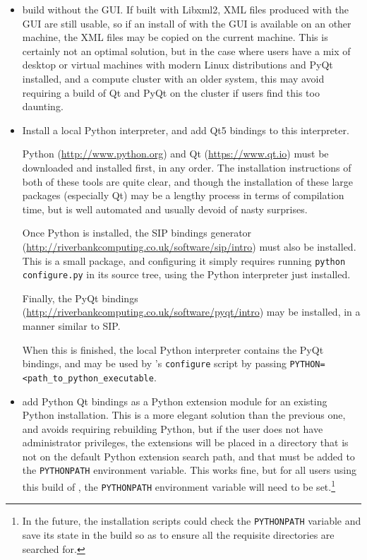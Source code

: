 \documentclass[a4paper,10pt,twoside]{csshortdoc}
\begin{document}
\begin{itemize}

\item build \CS without the GUI. If built with Libxml2, XML files
      produced with the GUI are still usable, so if an install of \CS
      with the GUI is available on an other machine, the XML files
      may be copied on the current machine. This is certainly not an optimal
      solution, but in the case where users have a mix of desktop or virtual
      machines with modern Linux distributions and PyQt installed, and
      a compute cluster with an older system, this may avoid requiring
      a build of Qt and PyQt on the cluster if users find this too daunting.

\item Install a local Python interpreter, and add Qt5 bindings to this
      interpreter.

      Python (\url{http://www.python.org}) and Qt
      (\url{https://www.qt.io}) must be downloaded  and
      installed first, in any order. The installation instructions of
      both of these tools are quite clear, and though the installation of these
      large packages (especially Qt) may be a lengthy process in terms of
      compilation time, but is well automated and usually devoid of nasty
      surprises.

      Once Python is installed, the SIP bindings generator
      (\url{http://riverbankcomputing.co.uk/software/sip/intro})
      must also be installed. This is a small package, and configuring it
      simply requires running \texttt{python configure.py} in its source
      tree, using the Python interpreter just installed.

      Finally, the PyQt bindings
      (\url{http://riverbankcomputing.co.uk/software/pyqt/intro}) may be
      installed, in a manner similar to SIP.

      When this is finished, the local Python interpreter contains
      the PyQt bindings, and may be used by \CS's \texttt{configure}
      script by passing \texttt{PYTHON=<path\_to\_python\_executable}.

\item add Python Qt bindings as a Python extension module for an existing
      Python installation. This is a more elegant solution than the previous
      one, and avoids requiring rebuilding Python, but if the user does not
      have administrator privileges, the extensions will be placed in a
      directory that is not on the default Python extension search path, and
      that must be added to the \texttt{PYTHONPATH} environment variable.
      This works fine, but for all users using this build of \CS, the
      \texttt{PYTHONPATH} environment variable will need to be
      set.\footnote{In the future, the \CS installation scripts could check
      the \texttt{PYTHONPATH} variable and save its state in the build so as
      to ensure all the requisite directories are searched for.}


\end{itemize}
\end{document}
